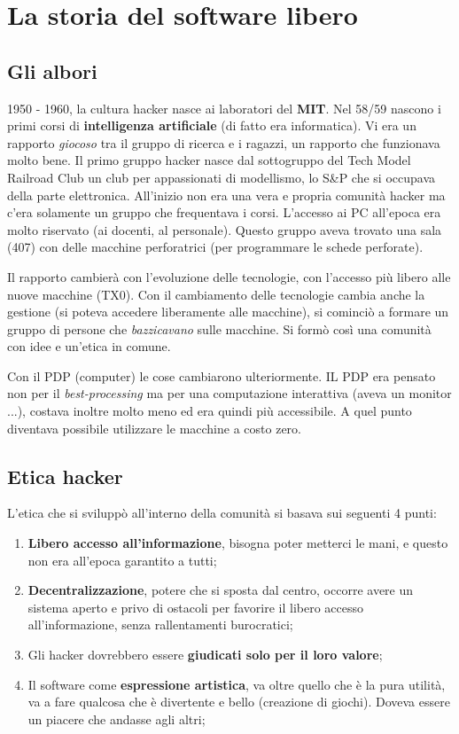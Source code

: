 \chapter{La storia del software libero}


\section{Gli albori}

1950 - 1960, la cultura hacker nasce ai laboratori del \textbf{MIT}. Nel 58/59 nascono i primi corsi di \textbf{intelligenza artificiale} (di fatto era informatica). Vi era un rapporto \textit{giocoso} tra il gruppo di ricerca e i ragazzi, un rapporto che funzionava molto bene. Il primo gruppo hacker nasce dal sottogruppo del Tech Model Railroad Club un club per appassionati di modellismo, lo S\&P che si occupava della parte elettronica. All'inizio non era una vera e propria comunità hacker ma c'era solamente un gruppo che frequentava i corsi. L'accesso ai PC all'epoca era molto riservato (ai docenti, al personale). Questo gruppo aveva trovato una sala (407) con delle macchine perforatrici (per programmare le schede perforate). 

Il rapporto cambierà con l'evoluzione delle tecnologie, con l'accesso più libero alle nuove macchine (TX0). Con il cambiamento delle tecnologie cambia anche la gestione (si poteva accedere liberamente alle macchine), si cominciò a formare un gruppo di persone che \textit{bazzicavano} sulle macchine. Si formò così una comunità con idee e un'etica in comune. 

Con il PDP (computer) le cose cambiarono ulteriormente. IL PDP era pensato non per il \textit{best-processing} ma per una computazione interattiva (aveva un monitor ...), costava inoltre molto meno ed era quindi più accessibile. A quel punto diventava possibile utilizzare le macchine a costo zero.

\section{Etica hacker}

L'etica che si sviluppò all'interno della comunità si basava sui seguenti 4 punti:

\begin{enumerate}

\item \textbf{Libero accesso all'informazione}, bisogna poter metterci le mani, e questo non era all'epoca garantito a tutti;
\item \textbf{Decentralizzazione}, potere che si sposta dal centro, occorre avere un sistema aperto e privo di ostacoli per favorire il libero accesso all'informazione, senza rallentamenti burocratici;
\item Gli hacker dovrebbero essere \textbf{giudicati solo per il loro valore};
\item Il software come \textbf{espressione artistica}, va oltre quello che è la pura utilità, va a fare qualcosa che è divertente e bello (creazione di giochi). Doveva essere un piacere che andasse agli altri;

\end{enumerate}

